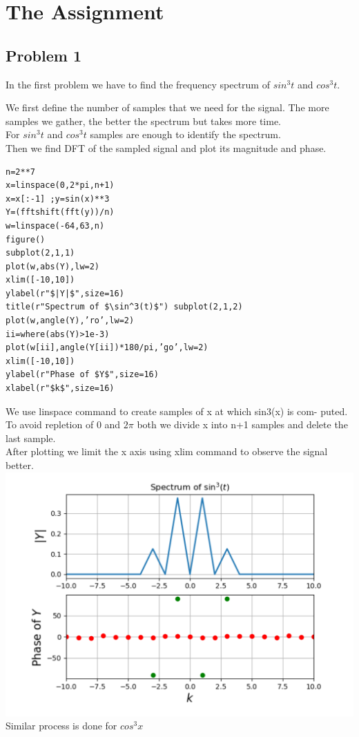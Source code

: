 \documentclass[10pt,english, openany]{book}
\begin{document}
\section{The Assignment}

\subsection{Problem 1}
In the first problem we have to find the frequency spectrum of $ sin^{3}t$ and $cos^{3}t$.\par
We first define the number of samples that we need for the signal. The more samples we gather, the better the spectrum but takes more time.\\
For $sin^{3}t$ and $cos^{3}t$ samples are enough to identify the spectrum. \\Then we find DFT of the sampled signal and plot its magnitude and phase.



\begin{verbatim}
n=2**7
x=linspace(0,2*pi,n+1)
x=x[:-1] ;y=sin(x)**3
Y=(fftshift(fft(y))/n)
w=linspace(-64,63,n)
figure()
subplot(2,1,1)
plot(w,abs(Y),lw=2)
xlim([-10,10])
ylabel(r"$|Y|$",size=16)
title(r"Spectrum of $\sin^3(t)$") subplot(2,1,2)
plot(w,angle(Y),’ro’,lw=2)
ii=where(abs(Y)>1e-3) 
plot(w[ii],angle(Y[ii])*180/pi,’go’,lw=2) 
xlim([-10,10])
ylabel(r"Phase of $Y$",size=16) 
xlabel(r"$k$",size=16)
\end{verbatim}
We use linspace command to create samples of x at which sin3(x) is com- puted.\\
To avoid repletion of 0 and $2\pi$ both we divide x into n+1 samples and delete the last sample.\\
After plotting we limit the x axis using xlim command to observe the signal better.\\
{\centering \includegraphics[scale=0.3]{Figure1.png}}\\
Similar process is done for $cos^{3}x$
\end{document}
